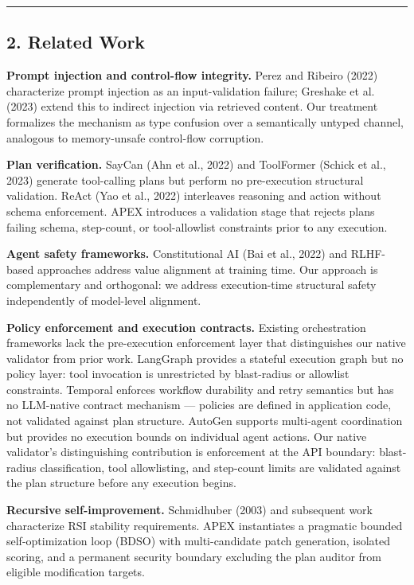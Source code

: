 \documentclass[
]{article}
\begin{document}
\begin{center}\rule{0.5\linewidth}{0.5pt}\end{center}

\subsection{2. Related Work}\label{2-related-work}

\textbf{Prompt injection and control-flow integrity.} Perez and Ribeiro
(2022) characterize prompt injection as an input-validation failure;
Greshake et al. (2023) extend this to indirect injection via retrieved
content. Our treatment formalizes the mechanism as type confusion over a
semantically untyped channel, analogous to memory-unsafe control-flow
corruption.

\textbf{Plan verification.} SayCan (Ahn et al., 2022) and ToolFormer
(Schick et al., 2023) generate tool-calling plans but perform no
pre-execution structural validation. ReAct (Yao et al., 2022)
interleaves reasoning and action without schema enforcement. APEX
introduces a validation stage that rejects plans failing schema,
step-count, or tool-allowlist constraints prior to any execution.

\textbf{Agent safety frameworks.} Constitutional AI (Bai et al., 2022)
and RLHF-based approaches address value alignment at training time. Our
approach is complementary and orthogonal: we address execution-time
structural safety independently of model-level alignment.

\textbf{Policy enforcement and execution contracts.} Existing
orchestration frameworks lack the pre-execution enforcement layer that
distinguishes our native validator from prior work. LangGraph provides
a stateful execution graph but no policy layer: tool invocation is
unrestricted by blast-radius or allowlist constraints. Temporal enforces
workflow durability and retry semantics but has no LLM-native contract
mechanism --- policies are defined in application code, not validated
against plan structure. AutoGen supports multi-agent coordination but
provides no execution bounds on individual agent actions. Our native
validator's distinguishing contribution is enforcement at the API
boundary: blast-radius classification, tool allowlisting, and step-count
limits are validated against the plan structure before any execution begins.

\textbf{Recursive self-improvement.} Schmidhuber (2003) and subsequent
work characterize RSI stability requirements. APEX instantiates a
pragmatic bounded self-optimization loop (BDSO) with multi-candidate
patch generation, isolated scoring, and a permanent security boundary
excluding the plan auditor from eligible modification targets.
\end{document}
